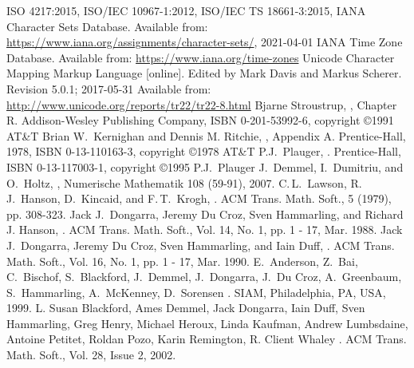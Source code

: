
\begin{thebibliography}{99}
  ISO 4217:2015,
  ISO/IEC 10967-1:2012,
  ISO/IEC TS 18661-3:2015,
  IANA Character Sets Database.
  Available from:\newline
  \url{https://www.iana.org/assignments/character-sets/}, 2021-04-01
  IANA Time Zone Database.
  Available from: \url{https://www.iana.org/time-zones}
  Unicode Character Mapping Markup Language [online].
  Edited by Mark Davis and Markus Scherer. Revision 5.0.1; 2017-05-31
  Available from: \url{http://www.unicode.org/reports/tr22/tr22-8.html}
  Bjarne Stroustrup,
  , Chapter R\@.
  Addison-Wesley Publishing Company, ISBN 0-201-53992-6, copyright \copyright 1991 AT\&T
  Brian W.\ Kernighan and Dennis M. Ritchie,
  , Appendix A\@.
  Prentice-Hall, 1978, ISBN 0-13-110163-3, copyright \copyright 1978 AT\&T
  P.J.\ Plauger,
  .
  Prentice-Hall, ISBN 0-13-117003-1, copyright \copyright 1995 P.J.\ Plauger
  J.\ Demmel, I.\ Dumitriu, and O.\ Holtz,
  ,
  Numerische Mathematik 108 (59-91), 2007.
  C.\,L.\ Lawson, R.\,J.\ Hanson, D.\ Kincaid, and F.\,T.\ Krogh,
  .
  ACM Trans. Math. Soft., 5 (1979), pp. 308-323.
  Jack J.\ Dongarra, Jeremy Du Croz, Sven Hammarling, and Richard J. Hanson,
  .
  ACM Trans. Math. Soft., Vol. 14, No. 1, pp. 1 - 17, Mar. 1988.
  Jack J.\ Dongarra, Jeremy Du Croz, Sven Hammarling, and Iain Duff,
  .
  ACM Trans. Math. Soft., Vol. 16, No. 1, pp. 1 - 17, Mar. 1990.
  E.\ Anderson, Z.\ Bai, C.\ Bischof, S.\ Blackford, J.\ Demmel, J.\ Dongarra,
  J.\ Du Croz, A.\ Greenbaum, S.\ Hammarling, A.\ McKenney, D.\ Sorensen
  .
  SIAM, Philadelphia, PA, USA, 1999.
  L. Susan Blackford, Ames Demmel, Jack Dongarra, Iain Duff, Sven Hammarling,
  Greg Henry, Michael Heroux, Linda Kaufman, Andrew Lumbsdaine, Antoine Petitet,
  Roldan Pozo, Karin Remington, R. Client Whaley
  .
  ACM Trans. Math. Soft., Vol. 28, Issue 2, 2002.
\end{thebibliography}

